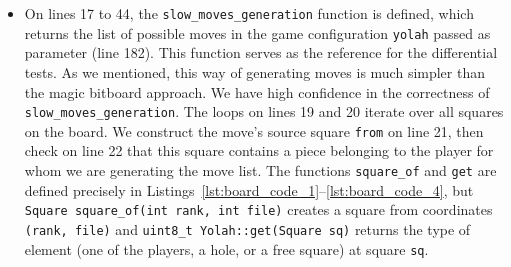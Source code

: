 \documentclass[12pt,a4paper,twoside,openright]{book}
\begin{document}
\begin{itemize}
\item On lines 17 to 44, the \texttt{slow_moves_generation} function is defined, which returns the list of possible moves in the game configuration \texttt{yolah} passed as parameter (line 182). This function serves as the reference for the differential tests. As we mentioned, this way of generating moves is much simpler than the magic bitboard approach. We have high confidence in the correctness of \texttt{slow_moves_generation}. The loops on lines 19 and 20 iterate over all squares on the board. We construct the move's source square \texttt{from} on line 21, then check on line 22 that this square contains a piece belonging to the player for whom we are generating the move list. The functions \texttt{square_of} and \texttt{get} are defined precisely in Listings~\ref{lst:board_code_1}--\ref{lst:board_code_4}, but \texttt{Square square_of(int rank, int file)} creates a square from coordinates \texttt{(rank, file)} and \texttt{uint8_t Yolah::get(Square sq)} returns the type of element (one of the players, a hole, or a free square) at square \texttt{sq}.

\end{itemize}
\end{document}
